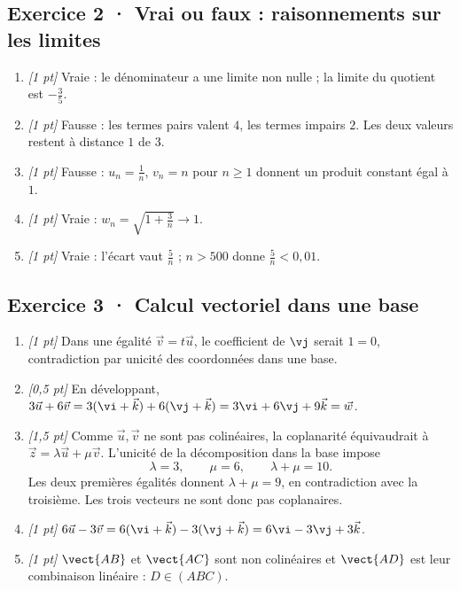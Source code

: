 \subsection*{Exercice 2 · Vrai ou faux : raisonnements sur les limites}\begin{enumerate}

\item \textit{[1 pt]} Vraie : le dénominateur a une limite non nulle ; la limite du quotient est $-\frac{3}{5}$.

\item \textit{[1 pt]} Fausse : les termes pairs valent $4$, les termes impairs $2$. Les deux valeurs restent à distance $1$ de $3$.

\item \textit{[1 pt]} Fausse : $u_n=\frac{1}{n}$, $v_n=n$ pour $n\ge1$ donnent un produit constant égal à $1$.

\item \textit{[1 pt]} Vraie : $w_n=\sqrt{1+\frac{3}{n}}\to1$.

\item \textit{[1 pt]} Vraie : l'écart vaut $\frac{5}{n}$ ; $n>500$ donne $\frac{5}{n}<0{,}01$.

\end{enumerate}

\subsection*{Exercice 3 · Calcul vectoriel dans une base}\begin{enumerate}

\item \textit{[1 pt]} Dans une égalité $\vec v=t\vec u$, le coefficient de $\vj $ serait $1=0$, contradiction par unicité des coordonnées dans une base.

\item \textit{[0,5 pt]} En développant, $3\vec u+6\vec v=3(\vi +\vec k)+6(\vj +\vec k)=3\vi +6\vj +9\vec k=\vec w$.

\item \textit{[1,5 pt]} Comme $\vec u,\vec v$ ne sont pas colinéaires, la coplanarité équivaudrait à $\vec z=\lambda\vec u+\mu\vec v$. L'unicité de la décomposition dans la base impose
\[\lambda=3,\qquad\mu=6,\qquad\lambda+\mu=10.\]
Les deux premières égalités donnent $\lambda+\mu=9$, en contradiction avec la troisième. Les trois vecteurs ne sont donc pas coplanaires.

\item \textit{[1 pt]} $6\vec u-3\vec v=6(\vi +\vec k)-3(\vj +\vec k)=6\vi -3\vj +3\vec k$.

\item \textit{[1 pt]} $\vect{AB}$ et $\vect{AC}$ sont non colinéaires et $\vect{AD}$ est leur combinaison linéaire : $D\in(ABC)$.

\end{enumerate}

